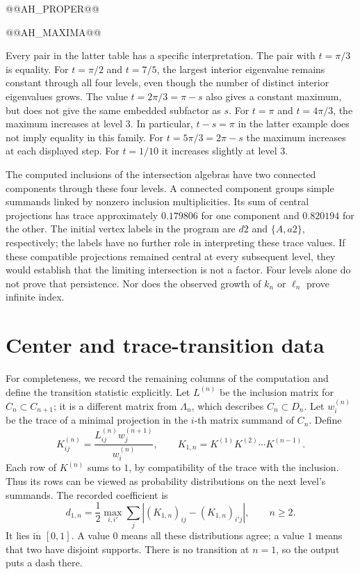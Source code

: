 \documentclass[11pt]{article}
\theoremstyle{definition}
\theoremstyle{remark}
\begin{document}
@@AH_PROPER@@

@@AH_MAXIMA@@

Every pair in the latter table has a specific interpretation.
The pair with \(t=\pi/3\) is equality. For \(t=\pi/2\) and \(t=7/5\),
the largest interior eigenvalue remains constant through all four
levels, even though the number of distinct interior eigenvalues grows.
The value \(t=2\pi/3=\pi-s\) also gives a constant maximum, but does
not give the same embedded subfactor as \(s\).
For \(t=\pi\) and \(t=4\pi/3\), the maximum increases at level \(3\).
In particular, \(t-s=\pi\) in the latter example does not imply
equality in this family. For \(t=5\pi/3=2\pi-s\) the maximum
increases at each displayed step. For \(t=1/10\) it increases
slightly at level \(3\).

The computed inclusions of the intersection algebras have two connected
components through these four levels. A connected component groups simple
summands linked by nonzero inclusion multiplicities. Its sum of central
projections has trace approximately \(0.179806\) for one component and
\(0.820194\) for the other. The initial vertex labels in the program
are \(d2\) and \(\{A,a2\}\), respectively; the labels have no further
role in interpreting these trace values.
If these compatible projections remained central at every subsequent
level, they would establish that the limiting intersection is not a
factor. Four levels alone do not prove that persistence. Nor does the
observed growth of \(k_n\) or \(\ell_n\) prove infinite index.

\section{Center and trace-transition data}\label{sec:centers}
For completeness, we record the remaining columns of the computation
and define the transition statistic explicitly. Let \(L^{(n)}\) be
the inclusion matrix for \(C_n\subset C_{n+1}\); it is a different
matrix from \(\Lambda_n\), which describes \(C_n\subset D_n\).
Let \(w_i^{(n)}\) be the trace of a minimal projection in the
\(i\)-th matrix summand of \(C_n\). Define
\[
 K^{(n)}_{ij}
 =\frac{L^{(n)}_{ij}w_j^{(n+1)}}{w_i^{(n)}},
 \qquad K_{1,n}=K^{(1)}K^{(2)}\cdots K^{(n-1)}.
\]
Each row of \(K^{(n)}\) sums to \(1\), by compatibility of the
trace with the inclusion. Thus its rows can be viewed as probability
distributions on the next level's summands. The recorded coefficient is
\[
 d_{1,n}=\frac12\max_{i,i'}
              \sum_j |(K_{1,n})_{ij}-(K_{1,n})_{i'j}|,
 \qquad n\geq2.
\]
It lies in \([0,1]\). A value \(0\) means all these distributions
agree; a value \(1\) means that two have disjoint supports.
There is no transition at \(n=1\), so the output puts a dash there.
\end{document}
